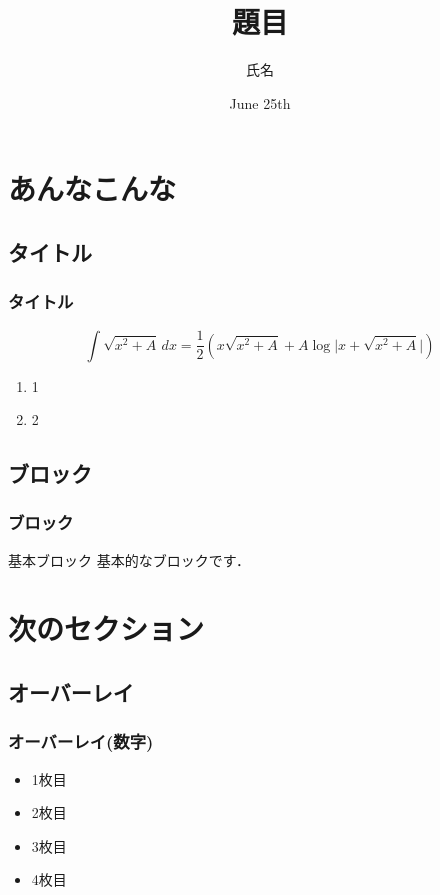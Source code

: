 \documentclass[dvipdfm]{beamer}
\title[題目(下部)]{題目}
\author[氏名(下部)]{氏名}
\institute[所属(下部)]{所属}
\date{June 25th}
\begin{document}
\maketitle

\section{あんなこんな}
\subsection{タイトル}
\begin{frame}[t]
 \frametitle{タイトル}

\[
  \int \sqrt{x^2+A}\, dx
  =\dfrac{1}{2}\left(x\sqrt{x^2+A}+A\log\big|x+\sqrt{x^2+A}\big|\right)
\]

 \begin{enumerate}
   \item 1
   \item 2
 \end{enumerate}

\end{frame}


\subsection{ブロック}
\begin{frame}[c]
 \frametitle{ブロック}
 \begin{block}{基本ブロック}
  基本的なブロックです．
 \end{block}
\end{frame}

\section{次のセクション}
\subsection{オーバーレイ}
\begin{frame}
 \frametitle{オーバーレイ(数字)}
 \begin{itemize}
   \item<1-> 1枚目
   \item<2-3> 2枚目
   \item<3> 3枚目
   \item<4> 4枚目
 \end{itemize}
\end{frame}
\end{document}
